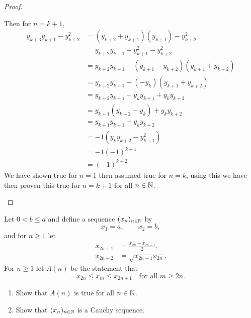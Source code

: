 \documentclass[10pt, a4paper]{article}
\begin{document}
\begin{example}
\begin{proof}
\begin{enumerate}[label = \alph*.]
                Then for $n = k + 1$,
                \begin{align*}
                    y_{k + 3}y_{k + 1} - y_{k + 2} ^ 2 &= (y_{k + 2} + y_{k + 1})(y_{k + 1}) - y_{k + 2} ^ 2 \\
                    &= y_{k + 2}y_{k + 1} + y_{k + 1} ^ 2 - y_{k + 2} ^ 2 \\
                    &= y_{k + 2}y_{k + 1} + (y_{k + 1} - y_{k + 2})(y_{k + 1} + y_{k + 2}) \\
                    &= y_{k + 2}y_{k + 1} + (-y_k)(y_{k + 1} + y_{k + 2}) \\
                    &= y_{k + 2}y_{k + 1} - y_ky_{k + 1} + y_ky_{k + 2} \\
                    &= y_{k + 1}(y_{k + 2} - y_k) + y_ky_{k + 2} \\
                    &= y_{k + 1}y_{k + 1} - y_ky_{k + 2} \\
                    &= -1(y_ky_{k + 2} - y_{k + 1}^2) \\
                    &= -1(-1)^{k + 1} \\
                    &= (-1)^{k + 2}
                \end{align*}
                We have shown true for $n = 1$ then assumed true for $n = k$, using this we have then proven this true for $n = k + 1$ for all $n \in \mathbb{N}$.
        \end{enumerate}
    \end{proof}
\end{example}

\begin{example}
    Let $0 < b \leq a$ and define a sequence $(x_n)_{n \in \mathbb{N}}$ by
    \[
    x_1 = a,\qquad x_2 = b,
    \]
    and for $n \geq 1$ let
    \begin{align*}
        x_{2n + 1} &= \frac{x_{2n} + x_{2n - 1}}{2}, \\
        x_{2n + 2} &= \sqrt{x_{2n + 1}x_{2n}}.
    \end{align*}
    For $n \geq 1$ let $A(n)$ be the statement that
    \[
    x_{2n} \leq x_m \leq x_{2n + 1}\quad\text{for all } m \geq 2n.
    \]
    \begin{enumerate}[label = \alph*.]
        \item Show that $A(n)$ is true for all $n \in \mathbb{N}$.
        \item Show that $(x_n)_{n \in \mathbb{N}}$ is a Cauchy sequence.
    \end{enumerate}
\end{example}
\end{document}
